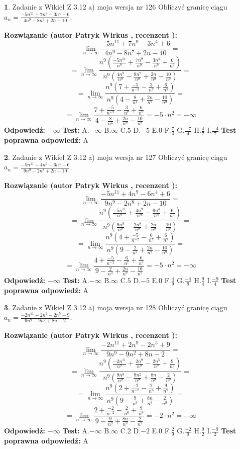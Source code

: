 \documentclass[12pt, a4paper]{article}
\theoremstyle{definition} %
\newtheorem{zad}{}
\newcommand{\zadStart}[1]{\begin{zad}#1\newline}
\newcommand{\zadStop}{\end{zad}}
\newcommand{\rozwStart}[2]{\noindent \textbf{Rozwiązanie (autor #1 , recenzent #2): }\newline}
\newcommand{\rozwStop}{\newline}
\newcommand{\odpStart}{\noindent \textbf{Odpowiedź:}\newline}
\newcommand{\odpStop}{\newline}
\newcommand{\testStart}{\noindent \textbf{Test:}\newline}
\newcommand{\testStop}{\newline}
\newcommand{\kluczStart}{\noindent \textbf{Test poprawna odpowiedź:}\newline}
\newcommand{\kluczStop}{\newline}
\begin{document}
\zadStart{Zadanie z Wikieł Z 3.12 a) moja wersja nr 126}
Obliczyć granicę ciągu $a_{n}=\frac{-5n^{11}+7n^{9}-3n^{4}+6}{4n^{9}-8n^{7}+2n-10}$.
\zadStop
\rozwStart{Patryk Wirkus}{}
$$\lim\limits_{n\to\infty}\frac{-5n^{11}+7n^{9}-3n^{4}+6}{4n^{9}-8n^{7}+2n-10}=$$
$$=\lim\limits_{n\to\infty}\frac{n^{9}\left(\frac{-5n^{11}}{n^{9}}+\frac{7n^{9}}{n^{9}}-\frac{3n^{4}}{n^{9}}+\frac{6}{n^{9}}\right)}{n^{9}\left(\frac{4n^{9}}{n^{9}}-\frac{8n^{7}}{n^{9}}+\frac{2n}{n^{9}}-\frac{10}{n^{9}}\right)}=$$
$$=\lim\limits_{n\to\infty}\frac{n^{9}\left(7+\frac{-5}{n^{-2}}-\frac{3}{n^{7}}+\frac{6}{n^{9}}\right)}
{n^{9}\left(4-\frac{8}{n^{4}}+\frac{2n}{n^{9}}-\frac{10}{n^{9}}\right)}=$$
$$=\lim\limits_{n\to\infty}\frac{7+\frac{-5}{n^{-2}}-\frac{3}{n^{7}}+\frac{6}{n^{9}}}{4-\frac{8}{n^{4}}+\frac{2n}{n^{9}}-\frac{10}{n^{9}}}=-5\cdot n^{2} = -\infty$$
\rozwStop
\odpStart
$-\infty$
\odpStop
\testStart
A.$-\infty$
B.$\infty$
C.$5$
D.$-5$
E.$0$
F.$\frac{7}{4}$
G.$\frac{-7}{4}$
H.$\frac{4}{7}$
I.$\frac{-4}{7}$
\testStop
\kluczStart
A
\kluczStop



\zadStart{Zadanie z Wikieł Z 3.12 a) moja wersja nr 127}
Obliczyć granicę ciągu $a_{n}=\frac{-5n^{11}+4n^{9}-6n^{4}+6}{9n^{9}-2n^{8}+2n-10}$.
\zadStop
\rozwStart{Patryk Wirkus}{}
$$\lim\limits_{n\to\infty}\frac{-5n^{11}+4n^{9}-6n^{4}+6}{9n^{9}-2n^{8}+2n-10}=$$
$$=\lim\limits_{n\to\infty}\frac{n^{9}\left(\frac{-5n^{11}}{n^{9}}+\frac{4n^{9}}{n^{9}}-\frac{6n^{4}}{n^{9}}+\frac{6}{n^{9}}\right)}{n^{9}\left(\frac{9n^{9}}{n^{9}}-\frac{2n^{8}}{n^{9}}+\frac{2n}{n^{9}}-\frac{10}{n^{9}}\right)}=$$
$$=\lim\limits_{n\to\infty}\frac{n^{9}\left(4+\frac{-5}{n^{-2}}-\frac{6}{n^{7}}+\frac{6}{n^{9}}\right)}
{n^{9}\left(9-\frac{2}{n^{3}}+\frac{2n}{n^{9}}-\frac{10}{n^{9}}\right)}=$$
$$=\lim\limits_{n\to\infty}\frac{4+\frac{-5}{n^{-2}}-\frac{6}{n^{7}}+\frac{6}{n^{9}}}{9-\frac{2}{n^{3}}+\frac{2n}{n^{9}}-\frac{10}{n^{9}}}=-5\cdot n^{2} = -\infty$$
\rozwStop
\odpStart
$-\infty$
\odpStop
\testStart
A.$-\infty$
B.$\infty$
C.$5$
D.$-5$
E.$0$
F.$\frac{4}{9}$
G.$\frac{-4}{9}$
H.$\frac{9}{4}$
I.$\frac{-9}{4}$
\testStop
\kluczStart
A
\kluczStop



\zadStart{Zadanie z Wikieł Z 3.12 a) moja wersja nr 128}
Obliczyć granicę ciągu $a_{n}=\frac{-2n^{11}+2n^{9}-2n^{5}+9}{9n^{9}-9n^{2}+8n-2}$.
\zadStop
\rozwStart{Patryk Wirkus}{}
$$\lim\limits_{n\to\infty}\frac{-2n^{11}+2n^{9}-2n^{5}+9}{9n^{9}-9n^{2}+8n-2}=$$
$$=\lim\limits_{n\to\infty}\frac{n^{9}\left(\frac{-2n^{11}}{n^{9}}+\frac{2n^{9}}{n^{9}}-\frac{2n^{5}}{n^{9}}+\frac{9}{n^{9}}\right)}{n^{9}\left(\frac{9n^{9}}{n^{9}}-\frac{9n^{2}}{n^{9}}+\frac{8n}{n^{9}}-\frac{2}{n^{9}}\right)}=$$
$$=\lim\limits_{n\to\infty}\frac{n^{9}\left(2+\frac{-2}{n^{-2}}-\frac{2}{n^{6}}+\frac{9}{n^{9}}\right)}
{n^{9}\left(9-\frac{9}{n^{9}}+\frac{8n}{n^{9}}-\frac{2}{n^{9}}\right)}=$$
$$=\lim\limits_{n\to\infty}\frac{2+\frac{-2}{n^{-2}}-\frac{2}{n^{6}}+\frac{9}{n^{9}}}{9-\frac{9}{n^{9}}+\frac{8n}{n^{9}}-\frac{2}{n^{9}}}=-2\cdot n^{2} = -\infty$$
\rozwStop
\odpStart
$-\infty$
\odpStop
\testStart
A.$-\infty$
B.$\infty$
C.$2$
D.$-2$
E.$0$
F.$\frac{2}{9}$
G.$\frac{-2}{9}$
H.$\frac{9}{2}$
I.$\frac{-9}{2}$
\testStop
\kluczStart
A
\kluczStop
\end{document}
